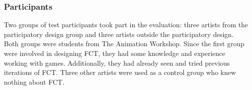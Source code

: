 \subsubsection{Participants}
Two groups of test participants took part in the evaluation: three artists from the participatory design group and three artists outside the participatory design. Both groups were students from The Animation Workshop. Since the first group were involved in designing FCT, they had some knowledge and experience working with games. Additionally, they had already seen and tried previous iterations of FCT. Three other artists were used as a control group who knew nothing about FCT.
